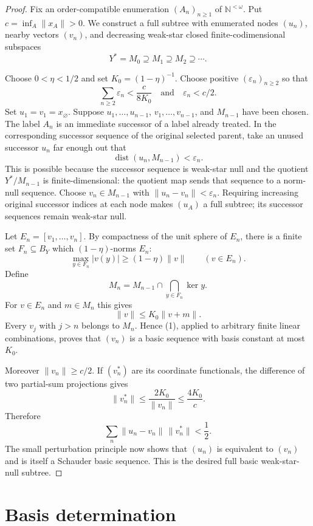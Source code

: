 \documentclass[11pt]{article}
\newcommand{\N}{\mathbb N}
\begin{document}
\begin{proof}
Fix an order-compatible enumeration $(A_n)_{n\geq1}$ of
$\N^{<\omega}$.  Put $c=\inf_A\|x_A\|>0$.  We construct a full subtree with
enumerated nodes $(u_n)$, nearby vectors $(v_n)$, and decreasing weak-star
closed finite-codimensional subspaces
\[
Y^*=M_0\supseteq M_1\supseteq M_2\supseteq\cdots.
\]

Choose $0<\eta<1/2$ and set $K_0=(1-\eta)^{-1}$.  Choose positive
$(\varepsilon_n)_{n\geq2}$ so that
\[
\sum_{n\geq2}\varepsilon_n<\frac{c}{8K_0}
\quad\text{and}\quad
\varepsilon_n<c/2.
\]
Set $u_1=v_1=x_\varnothing$.  Suppose $u_1,\ldots,u_{n-1}$,
$v_1,\ldots,v_{n-1}$, and $M_{n-1}$ have been chosen.  The label $A_n$ is
an immediate successor of a label already treated.  In the corresponding
successor sequence of the original selected parent, take an unused successor
$u_n$ far enough out that
\[
\operatorname{dist}(u_n,M_{n-1})<\varepsilon_n.
\]
This is possible because the successor sequence is weak-star null and the
quotient $Y^*/M_{n-1}$ is finite-dimensional: the quotient map sends that
sequence to a norm-null sequence.  Choose $v_n\in M_{n-1}$ with
$\|u_n-v_n\|<\varepsilon_n$.  Requiring increasing original successor
indices at each node makes $(u_A)$ a full subtree; its successor sequences
remain weak-star null.

Let $E_n=[v_1,\ldots,v_n]$.  By compactness of the unit sphere of $E_n$,
there is a finite set $F_n\subseteq B_Y$ which $(1-\eta)$-norms $E_n$:
\[
\max_{y\in F_n}|v(y)|\geq(1-\eta)\|v\|
\qquad(v\in E_n).
\]
Define
\[
M_n=M_{n-1}\cap\bigcap_{y\in F_n}\ker y.
\]
For $v\in E_n$ and $m\in M_n$ this gives
\[
\|v\|\leq K_0\|v+m\|.\tag{1}
\]
Every $v_j$ with $j>n$ belongs to $M_n$.  Hence (1), applied to arbitrary
finite linear combinations, proves that $(v_n)$ is a basic sequence with
basis constant at most $K_0$.

Moreover $\|v_n\|\geq c/2$.  If $(v_n^*)$ are its coordinate functionals,
the difference of two partial-sum projections gives
\[
\|v_n^*\|\leq \frac{2K_0}{\|v_n\|}\leq\frac{4K_0}{c}.
\]
Therefore
\[
\sum_n\|u_n-v_n\|\,\|v_n^*\|<\frac12.
\]
The small perturbation principle now shows that $(u_n)$ is equivalent to
$(v_n)$ and is itself a Schauder basic sequence.  This is the desired full
basic weak-star-null subtree.
\end{proof}

\section*{Basis determination}
\end{document}
